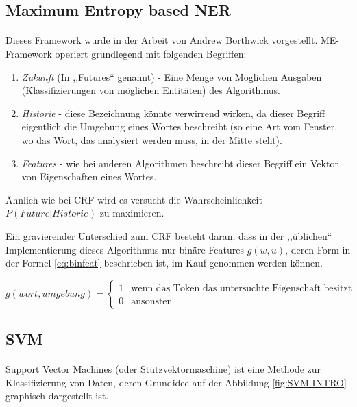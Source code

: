 \subsection{Maximum Entropy based NER}
\paragraph{}
Dieses Framework wurde in der Arbeit von Andrew Borthwick\cite{borthwick1999maximum} vorgestellt. ME-Framework operiert grundlegend mit folgenden Begriffen:
\begin{enumerate}
\item \textit{Zukunft} (In \cite{borthwick1999maximum} ,,Futures`` genannt) - Eine Menge von Möglichen Ausgaben (Klassifizierungen von möglichen Entitäten) des Algorithmus.
\item \textit{Historie} - diese Bezeichnung könnte verwirrend wirken, da dieser Begriff eigentlich die Umgebung eines Wortes beschreibt (so eine Art vom Fenster, wo das Wort, das analysiert werden muss, in der Mitte steht).
\item \textit{Features} - wie bei anderen Algorithmen beschreibt dieser Begriff ein Vektor von Eigenschaften eines Wortes.
\end{enumerate}
Ähnlich wie bei CRF wird es versucht die Wahrscheinlichkeit $P(Future|Historie)$ zu maximieren. 

Ein gravierender Unterschied zum CRF besteht daran, dass in der ,,üblichen`` Implementierung dieses Algorithmus nur binäre Features\cite{berger1996maximum} $g(w,u)$, deren Form in der Formel \ref{eq:binfeat} beschrieben ist, im Kauf genommen werden können. 

\begin{equation} \label{eq:binfeat}
g(wort, umgebung) = 
\begin{cases}
1  & \text{wenn das Token das untersuchte Eigenschaft besitzt} \\
0 & \text{ansonsten} 
\end{cases}
\end{equation}

\subsection{SVM}
\paragraph{}
Support Vector Machines (oder Stützvektormaschine) ist eine Methode zur Klassifizierung von Daten, deren Grundidee\cite{meyer2014support} auf der Abbildung \ref{fig:SVM-INTRO} graphisch dargestellt ist. 

